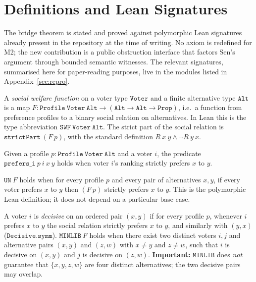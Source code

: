 \section{Definitions and Lean Signatures}
\label{sec:definitions}

The bridge theorem is stated and proved against polymorphic Lean signatures already present in the repository at the time of writing.
No axiom is redefined for M2; the new contribution is a public obstruction interface that factors Sen's argument through bounded semantic witnesses.
The relevant signatures, summarised here for paper-reading purposes, live in the modules listed in Appendix~\ref{sec:repro}.

\begin{definition}
\label{def:swf}
A \emph{social welfare function} on a voter type \(\mathtt{Voter}\) and a finite alternative type \(\mathtt{Alt}\) is a map
\(F : \mathtt{Profile\ Voter\ Alt} \to (\mathtt{Alt} \to \mathtt{Alt} \to \mathtt{Prop})\),
i.e.\ a function from preference profiles to a binary social relation on alternatives.
In Lean this is the type abbreviation \(\mathtt{SWF\ Voter\ Alt}\).
The strict part of the social relation is \(\mathtt{strictPart}\ (F\ p)\), with the standard definition \(R\ x\ y \wedge \neg R\ y\ x\).
\end{definition}

\begin{definition}
\label{def:prefers}
Given a profile \(p : \mathtt{Profile\ Voter\ Alt}\) and a voter \(i\), the predicate
\(\mathtt{prefers\_i}\ p\ i\ x\ y\) holds when voter \(i\)'s ranking strictly prefers \(x\) to \(y\).
\end{definition}

\begin{definition}
\label{def:un}
\(\mathtt{UN}\ F\) holds when for every profile \(p\) and every pair of alternatives \(x,y\), if every voter prefers \(x\) to \(y\) then \((F\ p)\) strictly prefers \(x\) to \(y\).
This is the polymorphic Lean definition; it does not depend on a particular base case.
\end{definition}

\begin{definition}
\label{def:minlib}
A voter \(i\) is \emph{decisive} on an ordered pair \((x,y)\) if for every profile \(p\), whenever \(i\) prefers \(x\) to \(y\) the social relation strictly prefers \(x\) to \(y\), and similarly with \((y,x)\) (\(\mathtt{Decisive.symm}\)).
\(\mathtt{MINLIB}\ F\) holds when there exist two distinct voters \(i,j\) and alternative pairs \((x,y)\) and \((z,w)\) with \(x \neq y\) and \(z \neq w\), such that \(i\) is decisive on \((x,y)\) and \(j\) is decisive on \((z,w)\).
\textbf{Important:} \(\mathtt{MINLIB}\) does \emph{not} guarantee that \(\{x,y,z,w\}\) are four distinct alternatives; the two decisive pairs may overlap.
\end{definition}

